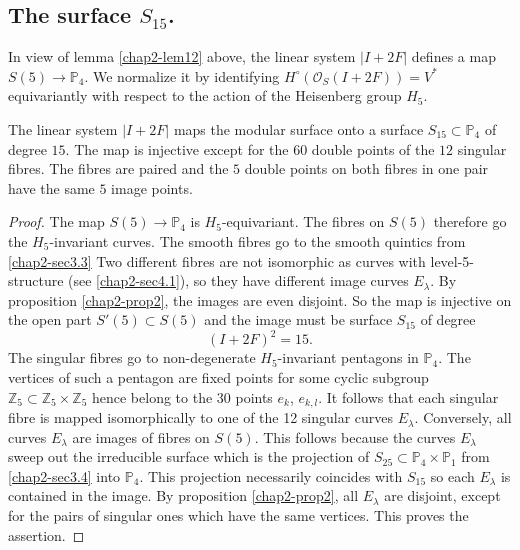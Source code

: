 \subsection{The surface \texorpdfstring{$S_{15}$}{S15}.}\label{chap2-sec4.5}

In view of lemma \ref{chap2-lem12} above, the linear system $|I+2F|$
defines a map $S(5)\to \mathbb{P}_{4}$. We normalize it by identifying
$H^{\circ}(\mathscr{O}_{S}(I+2F))=V^{*}$ equivariantly with respect to
the action of the Heisenberg group $H_{5}$. 

\begin{proposition}\label{chap2-prop9}
The linear system $|I+2F|$ maps the modular surface onto a surface
$S_{15}\subset \mathbb{P}_{4}$ of degree $15$. The map is injective
except for the $60$ double points of the $12$ singular fibres. The
fibres are paired and the $5$ double points on both fibres in one pair
have the same $5$ image points.
\end{proposition}

\begin{proof}
The map $S(5)\to \mathbb{P}_{4}$ is $H_{5}$-equivariant. The fibres on
$S(5)$ therefore go the $H_{5}$-invariant curves. The smooth fibres go
to the smooth quintics from \ref{chap2-sec3.3} Two different fibres
are not isomorphic as curves with level-5-structure
(see \ref{chap2-sec4.1}), so they have different image curves
$E_{\lambda}$. By proposition \ref{chap2-prop2}, the images are even
disjoint. So the map is injective on the open part $S'(5)\subset S(5)$
and the image must be surface $S_{15}$ of degree 
$$
(I+2F)^{2}=15.
$$
The singular fibres go to non-degenerate
$H_{5}$-invariant pentagons in $\mathbb{P}_{4}$. The vertices of such
a pentagon are fixed points for some cyclic subgroup
$\mathbb{Z}_{5}\subset \mathbb{Z}_{5}\times \mathbb{Z}_{5}$ hence
belong to the 30 points $e_{k}$, $e_{k,l}$. It follows that each
singular fibre is mapped isomorphically to one of the 12 singular
curves $E_{\lambda}$. Conversely, all curves $E_{\lambda}$ are images
of fibres on $S(5)$. This follows because the curves $E_{\lambda}$
sweep out the irreducible surface which is the projection of
$S_{25}\subset \mathbb{P}_{4}\times \mathbb{P}_{1}$
from \ref{chap2-sec3.4} into $\mathbb{P}_{4}$. This projection
necessarily coincides with $S_{15}$ so each $E_{\lambda}$ is contained
in the image. By proposition \ref{chap2-prop2}, all $E_{\lambda}$ are
disjoint, except for the pairs of singular ones which have the same
vertices. This proves the assertion.
\end{proof}


